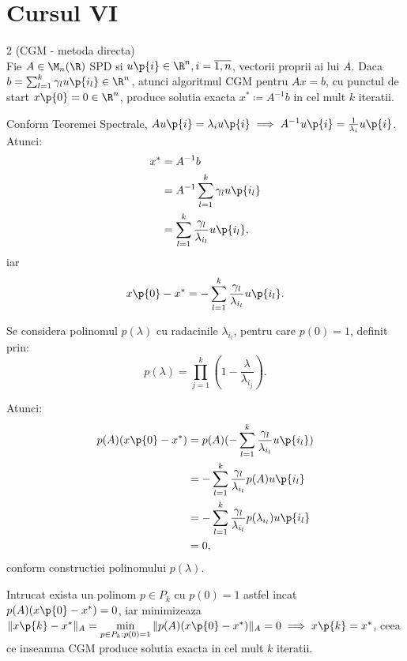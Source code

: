 
\section*{Cursul VI}

\begin{propozitie}{2 (CGM - metoda directa)}
    \text{ }\\[0.5em]
    Fie $A \in \M_n(\R)$ SPD si $u\p{i} \in \R^n, i=\overline{1,n}$, vectorii proprii ai lui $A$.
    Daca $b = \sum_{l=1}^k \gamma_l u\p{i_l} \in \R^n$, atunci algoritmul CGM pentru $Ax=b$, cu punctul de start $x\p{0} = 0 \in \R^n$, produce solutia exacta $x^* \coloneqq A^{-1}b$ in cel mult $k$ iteratii.
\end{propozitie}

\begin{demonstratie}
    Conform Teoremei Spectrale, $ A u\p{i} = \lambda_i u\p{i} \implies A^{-1} u\p{i} = \frac{1}{\lambda_i} u\p{i}$. Atunci:
    \begin{align*}
        x^{*} &= A^{-1} b \\
        &= A^{-1} \sum_{l=1}^k \gamma_l u\p{i_l} \\
        &= \sum_{l=1}^k \frac{\gamma_l}{\lambda_{i_l}} u\p{i_l},
    \end{align*}
    iar
    $$
    x\p{0} - x^{*} = - \sum_{l=1}^k \frac{\gamma_l}{\lambda_{i_l}} u\p{i_l}.
    $$

    \bigskip

    Se considera polinomul $ p(\lambda) $ cu radacinile $ \lambda_{i_l} $, pentru care $ p(0) = 1 $, definit prin:
    $$
    p(\lambda) = \prod_{j=1}^{k} \left( 1 - \frac{\lambda}{\lambda_{i_j}} \right).
    $$

    Atunci:
    \begin{align*}
        p(A)(x\p{0} - x^{*}) &= p(A) (- \sum_{l=1}^k \frac{\gamma_l}{\lambda_{i_l}} u\p{i_l}) \\
        &= - \sum_{l=1}^k \frac{\gamma_l}{\lambda_{i_l}} p(A) u\p{i_l} \\
        &= - \sum_{l=1}^k \frac{\gamma_l}{\lambda_{i_l}} p(\lambda_{i_l}) u\p{i_l} \\
        &= 0,
    \end{align*}
    conform constructiei polinomului $ p(\lambda) $.

    Intrucat exista un polinom $ p \in P_k$ cu $p(0) = 1 $ astfel incat $ p(A)(x\p{0} - x^{*}) = 0 $, iar minimizeaza $\|x\p{k} - x^*\|_A = \min\limits_{p \in P_k : p(0)=1} \|p(A)(x\p{0} - x^*)\|_A = 0 \implies x\p{k} = x^{*} $, ceea ce inseamna CGM produce solutia exacta in cel mult $ k $ iteratii.

\end{demonstratie}


